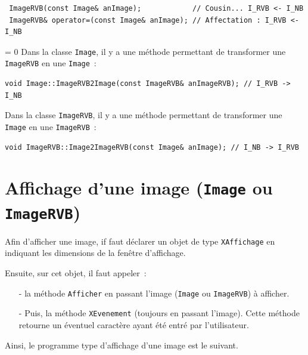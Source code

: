 \documentclass[12pt]{article}
\begin{document}
\begin{footnotesize}
\begin{verbatim}
 ImageRVB(const Image& anImage);            // Cousin... I_RVB <- I_NB
 ImageRVB& operator=(const Image& anImage); // Affectation : I_RVB <- I_NB
\end{verbatim}
\end{footnotesize}



 = 0
Dans la classe {\tt Image}, il y a une m\'ethode
permettant de transformer une {\tt ImageRVB} en une {\tt Image}~:

\begin{footnotesize}
\begin{verbatim}
void Image::ImageRVB2Image(const ImageRVB& anImageRVB); // I_RVB -> I_NB
\end{verbatim}
\end{footnotesize}

Dans la classe {\tt ImageRVB}, il y a une m\'ethode
permettant de transformer une {\tt Image} en une {\tt ImageRVB}~:

\begin{footnotesize}
\begin{verbatim}
void ImageRVB::Image2ImageRVB(const Image& anImage); // I_NB -> I_RVB
\end{verbatim}
\end{footnotesize}

\fi

\section{Affichage d'une image ({\tt Image} ou {\tt ImageRVB})}

Afin d'afficher une image, if faut d\'eclarer un objet de
type {\tt XAffichage} en indiquant les dimensions de la
fen\^etre d'affichage.

Ensuite, sur cet objet, il faut appeler~:
\begin{itemize}
\item[-] la m\'ethode {\tt Afficher} en passant l'image
({\tt Image} ou {\tt ImageRVB}) \`a afficher.
\item[-] Puis, la m\'ethode {\tt XEvenement} (toujours
en passant l'image).
Cette m\'ethode retourne un \'eventuel caract\`ere
ayant \'et\'e entr\'e par l'utilisateur.
\end{itemize}

Ainsi, le programme type d'affichage d'une image
est le suivant. 
\end{document}

